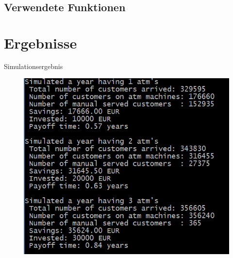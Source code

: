 \subsection{Verwendete Funktionen}
%

\section{Ergebnisse}
\begin{frame}[fragile]{Simulationsergebnis}
    	\begin{figure}[h!]
    	\includegraphics[scale=0.6]{BSP29_Output.PNG}
		\end{figure}
\end{frame}


